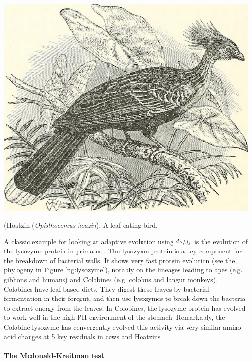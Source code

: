 \begin{marginfigure}
\begin{center}
\includegraphics[width=0.8  \textwidth]{illustration_images/Genetic_drift/Hoatzin/14747388314_85798ba97e_z.jpg}
\end{center}
\caption{ (Hoatzin ({\it Opisthocomus hoazin}). A leaf-eating bird. } \label{fig:hoatzin}
\end{marginfigure}
A classic example for looking at adaptive evolution using $\nicefrac{d_N}{d_S}$ is the
evolution of the lysozyme protein in primates \citep{Messier:97,Yang:98}. The lysozyme protein is
a key component for the breakdown of bacterial walls. It shows very
fast protein evolution (see
the phylogeny in Figure \ref{fig:lysozyme}), notably on the lineages leading to apes (e.g. gibbons
and humans) and Colobines (e.g. colobus and langur monkeys). Colobines have leaf-based diets. They digest
these leaves by bacterial fermentation in their foregut, and then use lysozymes to break down the bacteria to extract energy from the
leaves. In Colobines, the lysozyme protein has evolved to work well in the high-PH environment of the stomach. Remarkably, the Colobine
lysozyme has convergently evolved this activity via very similar amino-acid changes at 5 key residuals in cows and Hoatzins \citep[a leaf
eating bird,][]{kornegay1994molecular}

\paragraph{The Mcdonald-Kreitman test}


